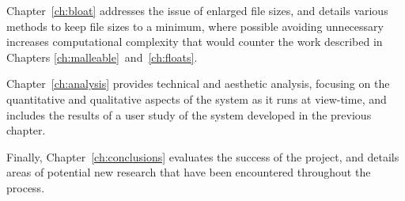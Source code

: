 \vspace{1em}
\noindent Chapter~\ref{ch:bloat} addresses the issue of enlarged file sizes, and details various methods to keep file sizes to a minimum, where possible avoiding unnecessary increases computational complexity that would counter the work described in Chapters \ref{ch:malleable}~and~\ref{ch:floats}.

\vspace{1em}
\noindent Chapter~\ref{ch:analysis} provides technical and aesthetic analysis, focusing on the quantitative and qualitative aspects of the system as it runs at view-time, and includes the results of a user study of the system developed in the previous chapter.

\vspace{1em}
\noindent Finally, Chapter~\ref{ch:conclusions} evaluates the success of the project, and details areas of potential new research that have been encountered throughout the process.

